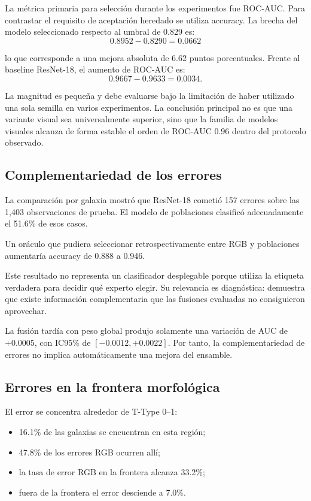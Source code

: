 \documentclass[letterpaper,11pt]{article}
\begin{document}
La métrica primaria para selección durante los experimentos fue ROC-AUC. Para contrastar el requisito de aceptación heredado se utiliza accuracy. La brecha del modelo seleccionado respecto al umbral de 0.829 es: \[ 0.8952 - 0.8290 = 0.0662 \]

lo que corresponde a una mejora absoluta de 6.62 puntos porcentuales. Frente al baseline ResNet-18, el aumento de ROC-AUC es: \[ 0.9667 - 0.9633 = 0.0034. \]

La magnitud es pequeña y debe evaluarse bajo la limitación de haber utilizado una sola semilla en varios experimentos. La conclusión principal no es que una variante visual sea universalmente superior, sino que la familia de modelos visuales alcanza de forma estable el orden de ROC-AUC 0.96 dentro del protocolo observado. 

\subsection{Complementariedad de los errores} 

La comparación por galaxia mostró que ResNet-18 cometió 157 errores sobre las 1,403 observaciones de prueba. El modelo de poblaciones clasificó adecuadamente el 51.6\% de esos casos.

Un oráculo que pudiera seleccionar retrospectivamente entre RGB y poblaciones aumentaría accuracy de 0.888 a 0.946. 

Este resultado no representa un clasificador desplegable porque utiliza la etiqueta verdadera para decidir qué experto elegir. Su relevancia es diagnóstica: demuestra que existe información complementaria que las fusiones evaluadas no consiguieron aprovechar. 

La fusión tardía con peso global produjo solamente una variación de AUC de +0.0005, con IC95\% de $[-0.0012,+0.0022]$. Por tanto, la complementariedad de errores no implica automáticamente una mejora del ensamble.

\subsection{Errores en la frontera morfológica} 

El error se concentra alrededor de T-Type 0--1:

\begin{itemize} 
  \item 16.1\% de las galaxias se encuentran en esta región; 
  \item 47.8\% de los errores RGB ocurren allí; 
  \item la tasa de error RGB en la frontera alcanza 33.2\%; 
  \item fuera de la frontera el error desciende a 7.0\%. 
\end{itemize}
\end{document}
